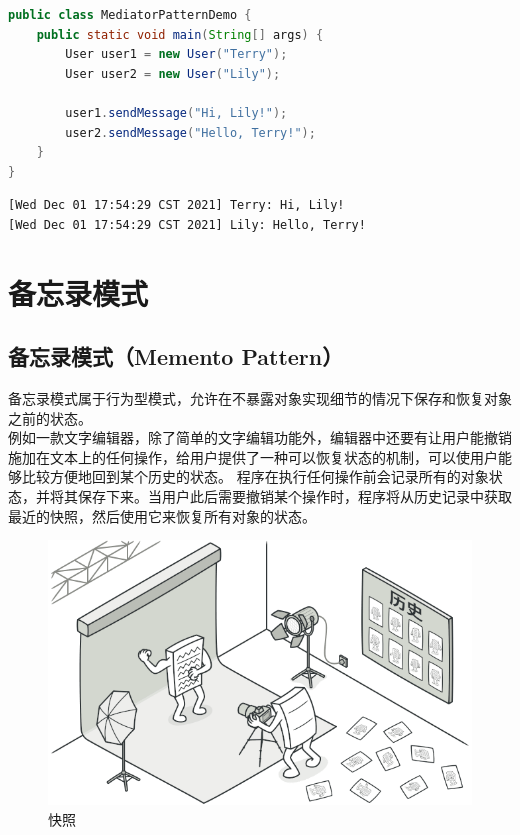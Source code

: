 \begin{lstlisting}[language=Java, title=MediatorPatternDemo.java]
public class MediatorPatternDemo {
    public static void main(String[] args) {
        User user1 = new User("Terry");
        User user2 = new User("Lily");

        user1.sendMessage("Hi, Lily!");
        user2.sendMessage("Hello, Terry!");
    }
}
\end{lstlisting}

\begin{tcolorbox}
    \begin{verbatim}
[Wed Dec 01 17:54:29 CST 2021] Terry: Hi, Lily!
[Wed Dec 01 17:54:29 CST 2021] Lily: Hello, Terry!
\end{verbatim}
\end{tcolorbox}

\newpage

\section{备忘录模式}

\subsection{备忘录模式（Memento Pattern）}

备忘录模式属于行为型模式，允许在不暴露对象实现细节的情况下保存和恢复对象之前的状态。\\

例如一款文字编辑器，除了简单的文字编辑功能外，编辑器中还要有让用户能撤销施加在文本上的任何操作，给用户提供了一种可以恢复状态的机制，可以使用户能够比较方便地回到某个历史的状态。 程序在执行任何操作前会记录所有的对象状态，并将其保存下来。当用户此后需要撤销某个操作时，程序将从历史记录中获取最近的快照，然后使用它来恢复所有对象的状态。

\begin{figure}[H]
    \centering
    \includegraphics[scale=0.6]{img/C4/4-20/1.png}
    \caption{快照}
\end{figure}


